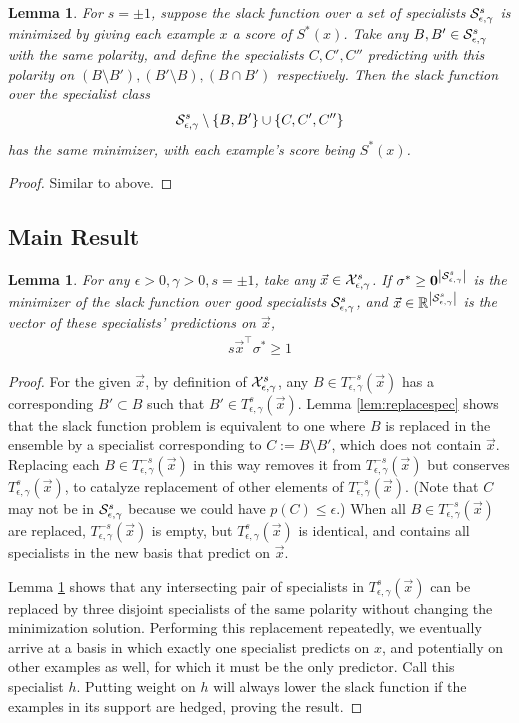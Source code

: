 \documentclass{article}
\newtheorem{lemma}[theorem]{Lemma}
\newcommand{\x}{\vec{x}}
\newcommand{\RR}{\mathbb{R}}      %
\newcommand{\abs}[1]{\left| #1 \right|}
\newcommand{\lrsetb}[1]{\left\{#1\right\}}
\newcommand{\vzero}{\mathbf{0}}
\begin{document}
\begin{lemma}
\label{lem:replacesamesign}
For $s = \pm 1$, suppose the slack function over a set of specialists ${\cal S}_{\epsilon,\gamma}^{s}$ is minimized by giving each example $x$ a score of $S^* (x)$. 
Take any $B, B' \in {\cal S}_{\epsilon,\gamma}^{s}$ with the same polarity, 
and define the specialists $C, C', C''$ predicting with this polarity on $(B \setminus B'), (B' \setminus B), (B \cap B')$ respectively. 
Then the slack function over the specialist class 
$$ \SepsGam^{s} \setminus \lrsetb{B, B'} \cup \lrsetb{C, C', C''} $$
has the same minimizer, with each example's score being $S^* (x)$. 
\end{lemma}
\begin{proof}
Similar to above.
\end{proof}

\subsection{Main Result}

\begin{lemma}
For any $\epsilon > 0, \gamma > 0, s = \pm 1$, take any $\x \in \XepsGamSig$. 
If $\sigma^* \geq \vzero^{\abs{\SepsGam^{s}}}$ is the minimizer of the slack function over good specialists ${\cal S}_{\epsilon,\gamma}^{s}$, 
and $\x \in \RR^{\abs{\SepsGam^{s}}}$ is the vector of these specialists' predictions on $\x$, 
\begin{align}
s \x^\top \sigma^* \geq 1
\end{align}
\end{lemma}
\begin{proof}
For the given $\x$, by definition of ${\cal X}_{\epsilon,\gamma}^{s}$, 
any $B \in T_{\epsilon, \gamma}^{-s} (\x)$ has a corresponding $B' \subset B$ such that $B' \in T_{\epsilon, \gamma}^{s} (\x)$. 
Lemma \ref{lem:replacespec} shows that the slack function problem is equivalent to one where $B$ is replaced in the ensemble by a specialist corresponding to $C := B \setminus B'$, 
which does not contain $\x$. 
Replacing each $B \in T_{\epsilon, \gamma}^{-s} (\x)$ in this way removes it from $T_{\epsilon, \gamma}^{-s} (\x)$ but conserves $T_{\epsilon, \gamma}^{s} (\x)$, 
to catalyze replacement of other elements of $T_{\epsilon, \gamma}^{-s} (\x)$. 
(Note that $C$ may not be in ${\cal S}_{\epsilon,\gamma}^{s}$ because we could have $p(C) \leq \epsilon$.)
When all $B \in T_{\epsilon, \gamma}^{-s} (\x)$ are replaced, $T_{\epsilon, \gamma}^{-s} (\x)$ is empty, 
but $T_{\epsilon, \gamma}^{s} (\x)$ is identical, 
and contains all specialists in the new basis that predict on $\x$. 

Lemma \ref{lem:replacesamesign} shows that any intersecting pair of specialists in $T_{\epsilon, \gamma}^{s} (\x)$ can be replaced by three disjoint specialists of the same polarity without changing the minimization solution. 
Performing this replacement repeatedly, we eventually arrive at a basis in which exactly one specialist predicts on $x$, and potentially on other examples as well, for which it must be the only predictor. Call this specialist $h$.
Putting weight on $h$ will always lower the slack function if the examples in its support are hedged, proving the result.
\end{proof}
\end{document}
